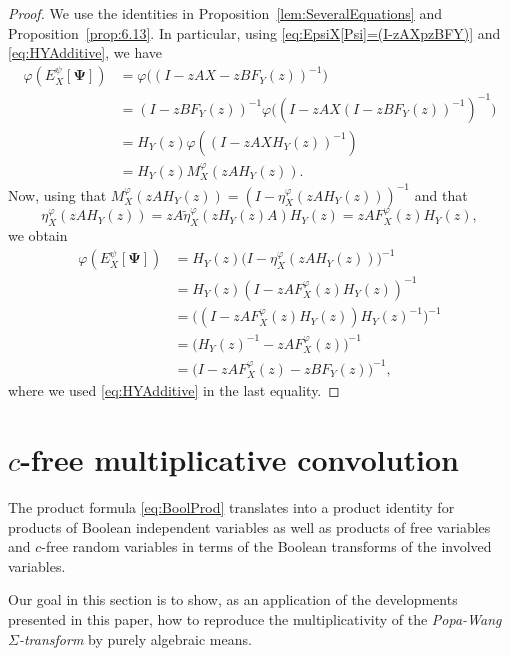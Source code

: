 \documentclass[12pt]{amsart}
\newcommand{\bPsi}{\boldsymbol{\Psi{}}}
\theoremstyle{definition}
\numberwithin{equation}{section}
\begin{document}
\begin{proof}
  We use the identities in Proposition~\ref{lem:SeveralEquations} and Proposition~\ref{prop:6.13}. In particular, using \eqref{eq:EpsiX[Psi]=(I-zAXpzBFY)} and \eqref{eq:HYAdditive}, we have
  \begin{align*}
    \varphi(E^\psi_X[\bPsi])
    &= \varphi\bigl((I-zAX-zBF_Y(z))^{-1}\bigr)\\
    &= (I-zBF_Y(z))^{-1}\varphi\bigl((I-zAX(I-zBF_Y(z))^{-1})^{-1}\bigr)   \\
    &= H_Y(z)\varphi((I-zAXH_Y(z))^{-1})   \\
    &= H_Y(z) M^\varphi_X(zAH_Y(z)).
  \end{align*}
  Now, using that $M_X^\varphi(zAH_Y(z)) = (I-\eta_X^\varphi(zAH_Y(z)))^{-1}$ and that 
  \[
    \eta^\varphi_X(zAH_Y(z))=zA\tilde{\eta}^\varphi_X(zH_Y(z)A)H_Y(z)=zAF^\varphi_X(z)H_Y(z),
  \]we obtain
  \begin{align*}
    \varphi(E^\psi_X[\bPsi])
    &=H_Y(z)
      \bigl(
      I-\eta^\varphi_X(zAH_Y(z))
      \bigr)^{-1}   \\
    &= H_Y(z)(I-zAF^\varphi_X(z)H_Y(z))^{-1}
    \\ &= \bigl((I-zAF^\varphi_X(z)H_Y(z))H_Y(z)^{-1}\bigr)^{-1}
    \\ &= \bigl( H_Y(z)^{-1} - zAF^\varphi_X(z)\bigr)^{-1}
    \\&= 
    \bigl(    I-zAF^\varphi_X(z)-zBF_Y(z)    \bigr)^{-1},
  \end{align*}
  where we used \eqref{eq:HYAdditive} in the last equality.
\end{proof}


\section{$c$-free multiplicative convolution}
\label{sec:sigmatransform}

The product formula     \eqref{eq:BoolProd} translates
into a product identity for products of Boolean independent variables
\cite{Popa:2009:multiplicative}
as well as products of free variables \cite {BelinschiNica:2008:semigroup}
and $c$-free random variables \cite{PopaWang:2011:multiplicative}
in terms of the Boolean transforms of the involved variables.

Our goal in this section is to show, as an application of the developments
presented in this paper, how to reproduce the multiplicativity of
the \emph{Popa-Wang $\Sigma$-transform}
\cite[Lemma~4.2]{PopaWang:2011:multiplicative}
by purely algebraic means.
\end{document}
